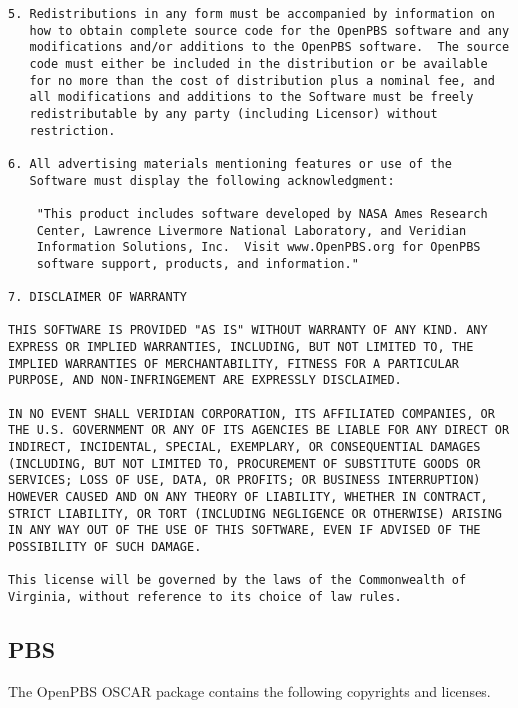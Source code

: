 \begin{verbatim}
5. Redistributions in any form must be accompanied by information on
   how to obtain complete source code for the OpenPBS software and any
   modifications and/or additions to the OpenPBS software.  The source
   code must either be included in the distribution or be available
   for no more than the cost of distribution plus a nominal fee, and
   all modifications and additions to the Software must be freely
   redistributable by any party (including Licensor) without
   restriction.

6. All advertising materials mentioning features or use of the
   Software must display the following acknowledgment:

    "This product includes software developed by NASA Ames Research
    Center, Lawrence Livermore National Laboratory, and Veridian
    Information Solutions, Inc.  Visit www.OpenPBS.org for OpenPBS
    software support, products, and information."

7. DISCLAIMER OF WARRANTY

THIS SOFTWARE IS PROVIDED "AS IS" WITHOUT WARRANTY OF ANY KIND. ANY
EXPRESS OR IMPLIED WARRANTIES, INCLUDING, BUT NOT LIMITED TO, THE
IMPLIED WARRANTIES OF MERCHANTABILITY, FITNESS FOR A PARTICULAR
PURPOSE, AND NON-INFRINGEMENT ARE EXPRESSLY DISCLAIMED.

IN NO EVENT SHALL VERIDIAN CORPORATION, ITS AFFILIATED COMPANIES, OR
THE U.S. GOVERNMENT OR ANY OF ITS AGENCIES BE LIABLE FOR ANY DIRECT OR
INDIRECT, INCIDENTAL, SPECIAL, EXEMPLARY, OR CONSEQUENTIAL DAMAGES
(INCLUDING, BUT NOT LIMITED TO, PROCUREMENT OF SUBSTITUTE GOODS OR
SERVICES; LOSS OF USE, DATA, OR PROFITS; OR BUSINESS INTERRUPTION)
HOWEVER CAUSED AND ON ANY THEORY OF LIABILITY, WHETHER IN CONTRACT,
STRICT LIABILITY, OR TORT (INCLUDING NEGLIGENCE OR OTHERWISE) ARISING
IN ANY WAY OUT OF THE USE OF THIS SOFTWARE, EVEN IF ADVISED OF THE
POSSIBILITY OF SUCH DAMAGE.

This license will be governed by the laws of the Commonwealth of
Virginia, without reference to its choice of law rules.
\end{verbatim}
%
%
%

\subsection{PBS}

The OpenPBS OSCAR package contains the following copyrights and
licenses.

